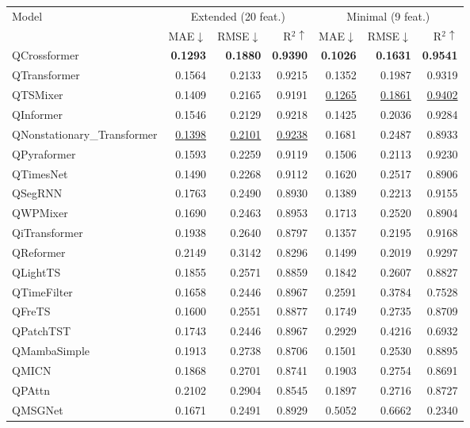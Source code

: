 \begin{table}[t]
\centering
\small
\setlength{\tabcolsep}{4.5pt}
\begin{tabular}{lrrrrrr}
\toprule
Model & \multicolumn{3}{c}{Extended (20 feat.)} & \multicolumn{3}{c}{Minimal (9 feat.)} \\
\cmidrule(lr){2-4} \cmidrule(lr){5-7}
  & MAE$\downarrow$ & RMSE$\downarrow$ & R$^2\uparrow$ & MAE$\downarrow$ & RMSE$\downarrow$ & R$^2\uparrow$ \\
\midrule
QCrossformer & \textbf{0.1293} & \textbf{0.1880} & \textbf{0.9390} & \textbf{0.1026} & \textbf{0.1631} & \textbf{0.9541} \\
QTransformer & 0.1564 & 0.2133 & 0.9215 & 0.1352 & 0.1987 & 0.9319 \\
QTSMixer & 0.1409 & 0.2165 & 0.9191 & \underline{0.1265} & \underline{0.1861} & \underline{0.9402} \\
QInformer & 0.1546 & 0.2129 & 0.9218 & 0.1425 & 0.2036 & 0.9284 \\
QNonstationary\_Transformer & \underline{0.1398} & \underline{0.2101} & \underline{0.9238} & 0.1681 & 0.2487 & 0.8933 \\
QPyraformer & 0.1593 & 0.2259 & 0.9119 & 0.1506 & 0.2113 & 0.9230 \\
QTimesNet & 0.1490 & 0.2268 & 0.9112 & 0.1620 & 0.2517 & 0.8906 \\
QSegRNN & 0.1763 & 0.2490 & 0.8930 & 0.1389 & 0.2213 & 0.9155 \\
QWPMixer & 0.1690 & 0.2463 & 0.8953 & 0.1713 & 0.2520 & 0.8904 \\
QiTransformer & 0.1938 & 0.2640 & 0.8797 & 0.1357 & 0.2195 & 0.9168 \\
QReformer & 0.2149 & 0.3142 & 0.8296 & 0.1499 & 0.2019 & 0.9297 \\
QLightTS & 0.1855 & 0.2571 & 0.8859 & 0.1842 & 0.2607 & 0.8827 \\
QTimeFilter & 0.1658 & 0.2446 & 0.8967 & 0.2591 & 0.3784 & 0.7528 \\
QFreTS & 0.1600 & 0.2551 & 0.8877 & 0.1749 & 0.2735 & 0.8709 \\
QPatchTST & 0.1743 & 0.2446 & 0.8967 & 0.2929 & 0.4216 & 0.6932 \\
QMambaSimple & 0.1913 & 0.2738 & 0.8706 & 0.1501 & 0.2530 & 0.8895 \\
QMICN & 0.1868 & 0.2701 & 0.8741 & 0.1903 & 0.2754 & 0.8691 \\
QPAttn & 0.2102 & 0.2904 & 0.8545 & 0.1897 & 0.2716 & 0.8727 \\
QMSGNet & 0.1671 & 0.2491 & 0.8929 & 0.5052 & 0.6662 & 0.2340 \\

\end{tabular}
\end{table}
